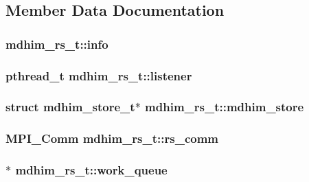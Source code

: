 \subsection{Member Data Documentation}
\hypertarget{structmdhim__rs__t_a23b6bfa000c31bbee0e71c4b6fbed2e9}{
\subsubsection[{info}]{ mdhim\-\_\-rs\-\_\-t\-::info}}\label{d3/d34/structmdhim__rs__t_a23b6bfa000c31bbee0e71c4b6fbed2e9}
\hypertarget{structmdhim__rs__t_a993ccccd48dfdf22dd1ced2578ed15e2}{
\subsubsection[{listener}]{\setlength{\rightskip}{0pt plus 5cm}pthread\-\_\-t mdhim\-\_\-rs\-\_\-t\-::listener}}\label{d3/d34/structmdhim__rs__t_a993ccccd48dfdf22dd1ced2578ed15e2}
\hypertarget{structmdhim__rs__t_aa393b01287a2253acff72c03cc5a83c5}{
\subsubsection[{mdhim\-\_\-store}]{\setlength{\rightskip}{0pt plus 5cm}struct {\bf mdhim\-\_\-store\-\_\-t}$\ast$ mdhim\-\_\-rs\-\_\-t\-::mdhim\-\_\-store}}\label{d3/d34/structmdhim__rs__t_aa393b01287a2253acff72c03cc5a83c5}
\hypertarget{structmdhim__rs__t_a0ed34bdf133e1d59d83d44d0fda49683}{
\subsubsection[{rs\-\_\-comm}]{\setlength{\rightskip}{0pt plus 5cm}M\-P\-I\-\_\-\-Comm mdhim\-\_\-rs\-\_\-t\-::rs\-\_\-comm}}\label{d3/d34/structmdhim__rs__t_a0ed34bdf133e1d59d83d44d0fda49683}
\hypertarget{structmdhim__rs__t_ab9b9e9145d08a9311917f42719937acc}{
\subsubsection[{work\-\_\-queue}]{$\ast$ mdhim\-\_\-rs\-\_\-t\-::work\-\_\-queue}}\label{d3/d34/structmdhim__rs__t_ab9b9e9145d08a9311917f42719937acc}
